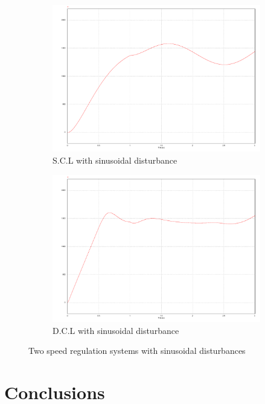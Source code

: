 \documentclass[11pt,english, openany]{book}
\begin{document}
\begin{figure}[H]
	\centering
	\begin{subfigure}{0.49\linewidth} \centering
		\includegraphics[scale=0.25]{Figures/single_sine_perturb}
		\caption{S.C.L with sinusoidal disturbance}\label{fig:figA}
	\end{subfigure}
	\begin{subfigure}{0.49\linewidth} \centering
		\includegraphics[scale=0.25]{Figures/dual_sine_perturb}
		\caption{D.C.L with sinusoidal disturbance}\label{fig:figB}
	\end{subfigure}
	\caption{Two speed regulation systems with sinusoidal disturbances} \label{fig:twodisturb}
\end{figure}
\chapter{Conclusions}
\end{document}
